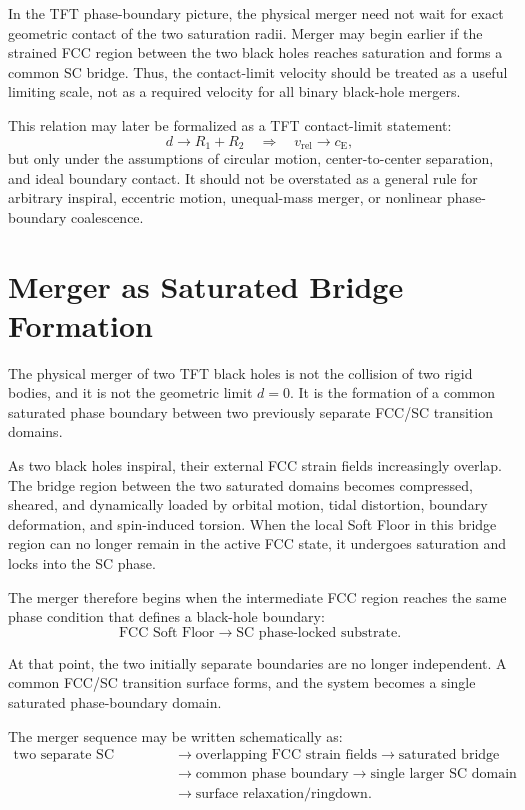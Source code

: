In the TFT phase-boundary picture, the physical merger need not wait for exact geometric contact of the two saturation radii. Merger may begin earlier if the strained FCC region between the two black holes reaches saturation and forms a common SC bridge. Thus, the contact-limit velocity should be treated as a useful limiting scale, not as a required velocity for all binary black-hole mergers.

This relation may later be formalized as a TFT contact-limit statement:
\begin{equation}
    d \rightarrow R_1 + R_2 \quad \Longrightarrow \quad v_{\mathrm{rel}} \rightarrow c_{\mathrm{E}},
\end{equation}
but only under the assumptions of circular motion, center-to-center separation, and ideal boundary contact. It should not be overstated as a general rule for arbitrary inspiral, eccentric motion, unequal-mass merger, or nonlinear phase-boundary coalescence.

\section{Merger as Saturated Bridge Formation}

The physical merger of two TFT black holes is not the collision of two rigid bodies, and it is not the geometric limit $d=0$. It is the formation of a common saturated phase boundary between two previously separate FCC/SC transition domains.

As two black holes inspiral, their external FCC strain fields increasingly overlap. The bridge region between the two saturated domains becomes compressed, sheared, and dynamically loaded by orbital motion, tidal distortion, boundary deformation, and spin-induced torsion. When the local Soft Floor in this bridge region can no longer remain in the active FCC state, it undergoes saturation and locks into the SC phase.

The merger therefore begins when the intermediate FCC region reaches the same phase condition that defines a black-hole boundary:
\begin{equation}
    \text{FCC Soft Floor} \rightarrow \text{SC phase-locked substrate}.
\end{equation}

At that point, the two initially separate boundaries are no longer independent. A common FCC/SC transition surface forms, and the system becomes a single saturated phase-boundary domain.

The merger sequence may be written schematically as:
\begin{equation}
\begin{split}
    \text{two separate SC domains} &\rightarrow \text{overlapping FCC strain fields} \rightarrow \text{saturated bridge} \\
    &\rightarrow \text{common phase boundary} \rightarrow \text{single larger SC domain} \\
    &\rightarrow \text{surface relaxation/ringdown}.
\end{split}
\end{equation}

